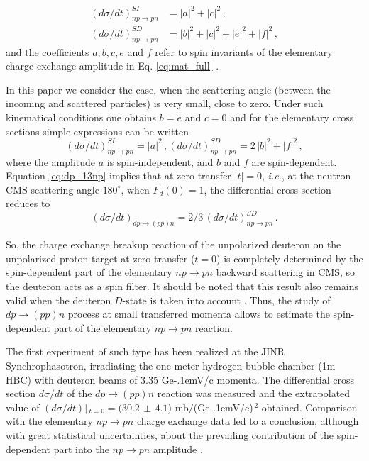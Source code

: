 \documentclass[twocolumn,epjc3]{svjour3}
\newcommand{\np}     {\ensuremath{np \rightarrow pn}\xspace}
\newcommand{\dpchex} {\ensuremath{dp \rightarrow (pp)n}\xspace}
\newcommand{\GeVc}   {Ge\kern-.1emV/c\xspace}
\begin{document}
\begin{equation}
  \begin{split}
    (d\sigma/dt)^{SI}_{\np} &= |a|^2 +|c|^2\,,\\
    (d\sigma/dt)^{SD}_{\np} &= |b|^2 + |c|^2 + |e|^2 + |f|^2\,,
  \end{split}
\end{equation}
and the coefficients $a, b, c, e$ and $f$ refer to spin invariants of the
elementary charge exchange amplitude in Eq. \eqref{eq:mat_full}
\cite{dea72,ala75_2}.

In this paper we consider the case, when the scattering angle (between the
incoming and scattered particles) is very small, close to zero. Under such
kinematical conditions one obtains $b = e$ and $c = 0$ and for the elementary
cross sections simple expressions can be written
\begin{equation}
  (d\sigma/dt)^{SI}_{\np} = |a|^2\,,
  (d\sigma/dt)^{SD}_{\np} = 2\,|b|^2 + |f|^2\,,
\end{equation}
where the amplitude $a$ is spin-independent, and $b$ and $f$ are spin-dependent.
Equation \eqref{eq:dp_13np} implies that at zero transfer $|t| = 0$,
\textit{i.e.}, at the neutron CMS scattering angle $180^\circ$, when
$F_d(0) = 1$, the differential cross section reduces to
\begin{equation}
  \label{eq:dp_23np}
  (d\sigma/dt)_{\dpchex} = 2/3\,(d\sigma/dt)^{SD}_{\np}\,.
\end{equation}

So, the charge exchange breakup reaction of the unpolarized deuteron on the
unpolarized proton target at zero transfer ($t = 0$) is completely determined by
the spin-dependent part of the elementary \np backward scattering in CMS, so the
deuteron acts as a spin filter. It should be noted that this result also remains
valid when the deuteron $D$-state is taken into account \cite{led04}. Thus, the
study of \dpchex process at small transferred momenta allows to estimate the
spin-dependent part of the elementary \np reaction.

The first experiment of such type has been realized at the JINR
Synchrophasotron, irradiating the one meter hydrogen bubble chamber (1m HBC)
with deuteron beams of 3.35 \GeVc momenta. The differential cross section
$d\sigma/dt$ of the \dpchex reaction was measured and the extra\-polated value
of $(d\sigma/dt)|\,_{t=0}=(30.2\,\pm\,4.1$) mb$/$(\GeVc)$^{\,2}$ obtained.
Comparison with the elementary \np charge exchange data led to a conclusion,
although with great statistical uncertainties, about the prevailing contribution
of the spin-dependent part into the \np amplitude \cite{gla02,gla08}.
\end{document}
